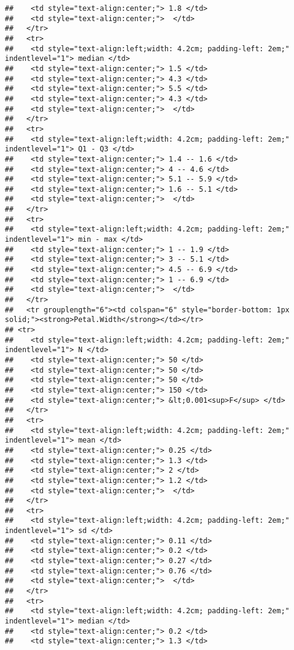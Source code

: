 \documentclass[
]{article}
\begin{document}
\begin{verbatim}
##    <td style="text-align:center;"> 1.8 </td>
##    <td style="text-align:center;">  </td>
##   </tr>
##   <tr>
##    <td style="text-align:left;width: 4.2cm; padding-left: 2em;" indentlevel="1"> median </td>
##    <td style="text-align:center;"> 1.5 </td>
##    <td style="text-align:center;"> 4.3 </td>
##    <td style="text-align:center;"> 5.5 </td>
##    <td style="text-align:center;"> 4.3 </td>
##    <td style="text-align:center;">  </td>
##   </tr>
##   <tr>
##    <td style="text-align:left;width: 4.2cm; padding-left: 2em;" indentlevel="1"> Q1 - Q3 </td>
##    <td style="text-align:center;"> 1.4 -- 1.6 </td>
##    <td style="text-align:center;"> 4 -- 4.6 </td>
##    <td style="text-align:center;"> 5.1 -- 5.9 </td>
##    <td style="text-align:center;"> 1.6 -- 5.1 </td>
##    <td style="text-align:center;">  </td>
##   </tr>
##   <tr>
##    <td style="text-align:left;width: 4.2cm; padding-left: 2em;" indentlevel="1"> min - max </td>
##    <td style="text-align:center;"> 1 -- 1.9 </td>
##    <td style="text-align:center;"> 3 -- 5.1 </td>
##    <td style="text-align:center;"> 4.5 -- 6.9 </td>
##    <td style="text-align:center;"> 1 -- 6.9 </td>
##    <td style="text-align:center;">  </td>
##   </tr>
##   <tr grouplength="6"><td colspan="6" style="border-bottom: 1px solid;"><strong>Petal.Width</strong></td></tr>
## <tr>
##    <td style="text-align:left;width: 4.2cm; padding-left: 2em;" indentlevel="1"> N </td>
##    <td style="text-align:center;"> 50 </td>
##    <td style="text-align:center;"> 50 </td>
##    <td style="text-align:center;"> 50 </td>
##    <td style="text-align:center;"> 150 </td>
##    <td style="text-align:center;"> &lt;0.001<sup>F</sup> </td>
##   </tr>
##   <tr>
##    <td style="text-align:left;width: 4.2cm; padding-left: 2em;" indentlevel="1"> mean </td>
##    <td style="text-align:center;"> 0.25 </td>
##    <td style="text-align:center;"> 1.3 </td>
##    <td style="text-align:center;"> 2 </td>
##    <td style="text-align:center;"> 1.2 </td>
##    <td style="text-align:center;">  </td>
##   </tr>
##   <tr>
##    <td style="text-align:left;width: 4.2cm; padding-left: 2em;" indentlevel="1"> sd </td>
##    <td style="text-align:center;"> 0.11 </td>
##    <td style="text-align:center;"> 0.2 </td>
##    <td style="text-align:center;"> 0.27 </td>
##    <td style="text-align:center;"> 0.76 </td>
##    <td style="text-align:center;">  </td>
##   </tr>
##   <tr>
##    <td style="text-align:left;width: 4.2cm; padding-left: 2em;" indentlevel="1"> median </td>
##    <td style="text-align:center;"> 0.2 </td>
##    <td style="text-align:center;"> 1.3 </td>

\end{verbatim}
\end{document}
